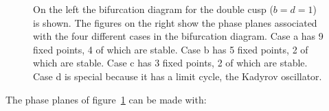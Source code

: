 \documentclass[
  a4paper,
  DIV=11,
  numbers=noendperiod,
  oneside]{scrreprt}
\begin{document}
\begin{figure}


\caption{\label{fig-ch4n-img16-old-64}On the left the bifurcation
diagram for the double cusp (\(b = d = 1\)) is shown. The figures on the
right show the phase planes associated with the four different cases in
the bifurcation diagram. Case a has 9 fixed points, 4 of which are
stable. Case b has 5 fixed points, 2 of which are stable. Case c has 3
fixed points, 2 of which are stable. Case d is special because it has a
limit cycle, the Kadyrov oscillator.}

\end{figure}%

The phase planes of figure~\ref{fig-ch4n-img16-old-64} can be made with:
\end{document}
